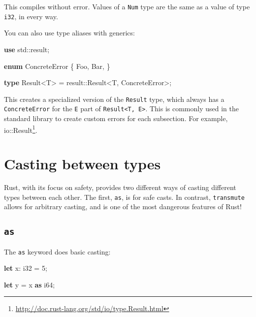 \documentclass[a4paper,]{book}
\newenvironment{Shaded}{\begin{snugshade}}{\end{snugshade}}
\newcommand{\KeywordTok}[1]{\textcolor[rgb]{0.13,0.29,0.53}{\textbf{{#1}}}}
\newcommand{\DataTypeTok}[1]{\textcolor[rgb]{0.13,0.29,0.53}{{#1}}}
\newcommand{\DecValTok}[1]{\textcolor[rgb]{0.00,0.00,0.81}{{#1}}}
\newcommand{\NormalTok}[1]{{#1}}
\renewcommand{\href}[2]{#2\footnote{\url{#1}}}
\begin{document}
This compiles without error. Values of a \texttt{Num} type are the same
as a value of type \texttt{i32}, in every way.

You can also use type aliases with generics:

\begin{Shaded}
\begin{Highlighting}[]
\KeywordTok{use} \NormalTok{std::result;}

\KeywordTok{enum} \NormalTok{ConcreteError \{}
    \NormalTok{Foo,}
    \NormalTok{Bar,}
\NormalTok{\}}

\KeywordTok{type} \NormalTok{Result<T> = result::}\DataTypeTok{Result}\NormalTok{<T, ConcreteError>;}
\end{Highlighting}
\end{Shaded}

This creates a specialized version of the \texttt{Result} type, which
always has a \texttt{ConcreteError} for the \texttt{E} part of
\texttt{Result\textless{}T,\ E\textgreater{}}. This is commonly used in
the standard library to create custom errors for each subsection. For
example,
\href{http://doc.rust-lang.org/std/io/type.Result.html}{io::Result}.

\section{Casting between types}\label{sec--casting-between-types}

Rust, with its focus on safety, provides two different ways of casting
different types between each other. The first, \texttt{as}, is for safe
casts. In contrast, \texttt{transmute} allows for arbitrary casting, and
is one of the most dangerous features of Rust!

\subsection{\texorpdfstring{\texttt{as}}{as}}\label{as}

The \texttt{as} keyword does basic casting:

\begin{Shaded}
\begin{Highlighting}[]
\KeywordTok{let} \NormalTok{x: }\DataTypeTok{i32} \NormalTok{= }\DecValTok{5}\NormalTok{;}

\KeywordTok{let} \NormalTok{y = x }\KeywordTok{as} \DataTypeTok{i64}\NormalTok{;}
\end{Highlighting}
\end{Shaded}
\end{document}
